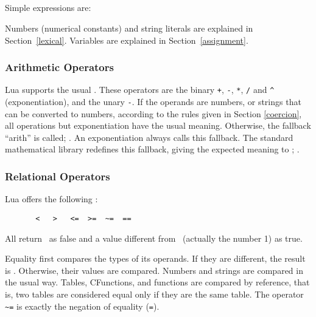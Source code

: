 \subsection{}

\subsubsection{}
Simple expressions are:
\begin{Produc}
\end{Produc}%
Numbers (numerical constants) and
string literals are explained in Section~\ref{lexical}.
Variables are explained in Section~\ref{assignment}.

\subsubsection{Arithmetic Operators}
Lua supports the usual .
These operators are the binary
\verb'+', \verb'-', \verb'*', \verb'/' and \verb'^' (exponentiation),
and the unary \verb'-'.
If the operands are numbers, or strings that can be converted to
numbers, according to the rules given in Section \ref{coercion},
all operations but exponentiation have the usual meaning.
Otherwise, the fallback ``arith'' is called; .
An exponentiation always calls this fallback.
The standard mathematical library redefines this fallback,
giving the expected meaning to ;
.

\subsubsection{Relational Operators}
Lua offers  the following :
\begin{verbatim}
       <   >   <=  >=  ~=  ==
\end{verbatim}
All return \nil\ as false and a value different from \nil\
(actually the number 1) as true.

Equality first compares the types of its operands.
If they are different, the result is \nil.
Otherwise, their values are compared.
Numbers and strings are compared in the usual way.
Tables, CFunctions, and functions are compared by reference,
that is, two tables are considered equal only if they are the same table.
The operator \verb'~=' is exactly the negation of equality (\verb'=').

